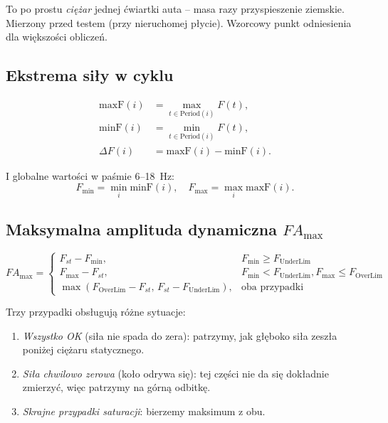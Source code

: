 \documentclass[11pt,a4paper]{article}
\theoremstyle{plainpol}
\begin{document}
\begin{intuicja}
To po prostu \emph{ciężar} jednej ćwiartki auta -- masa razy
przyspieszenie ziemskie. Mierzony przed testem (przy nieruchomej
płycie). Wzorcowy punkt odniesienia dla większości obliczeń.
\end{intuicja}

\subsection{Ekstrema siły w cyklu}

\begin{align}
  \mathrm{maxF}(i) &= \max_{t\in\mathrm{Period}(i)} F(t),\\
  \mathrm{minF}(i) &= \min_{t\in\mathrm{Period}(i)} F(t),\\
  \Delta F(i) &= \mathrm{maxF}(i) - \mathrm{minF}(i).
\end{align}

I globalne wartości w paśmie 6--18~Hz:
\begin{equation}
  F_{\min} = \min_{i} \mathrm{minF}(i), \quad F_{\max} = \max_{i} \mathrm{maxF}(i).
\end{equation}

\subsection{Maksymalna amplituda dynamiczna $FA_{\max}$}

\begin{equation}
  FA_{\max} = \begin{cases}
    F_{st} - F_{\min}, & F_{\min} \geq F_{\mathrm{UnderLim}} \\
    F_{\max} - F_{st}, & F_{\min} < F_{\mathrm{UnderLim}}, F_{\max} \leq F_{\mathrm{OverLim}} \\
    \max(F_{\mathrm{OverLim}} - F_{st},\,F_{st} - F_{\mathrm{UnderLim}}), & \text{oba przypadki}
  \end{cases}
\end{equation}

\begin{intuicja}
Trzy przypadki obsługują różne sytuacje:
\begin{enumerate}
  \item \emph{Wszystko OK} (siła nie spada do zera): patrzymy, jak głęboko
    siła zeszła poniżej ciężaru statycznego.
  \item \emph{Siła chwilowo zerowa} (koło odrywa się): tej części nie
    da się dokładnie zmierzyć, więc patrzymy na górną odbitkę.
  \item \emph{Skrajne przypadki saturacji}: bierzemy maksimum z obu.
\end{enumerate}
\end{intuicja}
\end{document}
